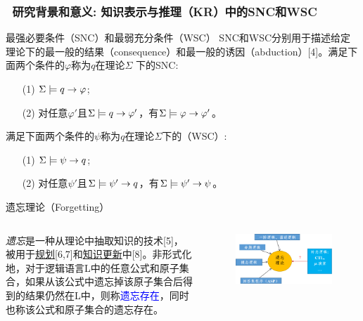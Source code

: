 \documentclass[9pt, CJK]{beamer}
\begin{document}
	\begin{frame}
		\frametitle{~研究背景和意义: {\small 知识表示与推理（KR）中的SNC和WSC}}
		{\small\begin{block}{最强必要条件（SNC）和最弱充分条件（WSC）}
			SNC和WSC分别用于描述给定理论下的最一般的结果（consequence）和最一般的诱因（abduction）[4]。满足下面两个条件的$\varphi$称为$q$在理论$\Sigma$ 下的SNC:
			\begin{itemize}
				\item[(1)] $\Sigma \models q \rightarrow \varphi$;
				\item[(2)] 对任意$\varphi'$且$\Sigma \models q \rightarrow \varphi'$，有$\Sigma \models \varphi \rightarrow \varphi'$。
			\end{itemize}
		满足下面两个条件的$\psi$称为$q$在理论$\Sigma$下的（WSC）:
		\begin{itemize}
			\item[(1)] $\Sigma \models \psi \rightarrow q$;
			\item[(2)] 对任意$\psi'$且$\Sigma \models \psi' \rightarrow q$，有$\Sigma \models \psi' \rightarrow \psi$。
		\end{itemize}
		\end{block}}
		\vskip 0.5pt
		{\small\begin{block}{遗忘理论（Forgetting）}
			\begin{columns}
				 {\em 遗忘}是一种从理论中抽取知识的技术[5]，被用于\underline{规划}[6,7]和\underline{知识更新}中[8]。非形式化地，对于逻辑语言L中的任意公式和原子集合，如果从该公式中遗忘掉该原子集合后得到的结果仍然在L中，则称\textcolor{blue}{遗忘存在}，同时也称该公式和原子集合的遗忘存在。
				\begin{figure}
					\includegraphics[scale=0.35]{figures/forgetting}
				\end{figure}
			\end{columns}
		\end{block}}
	\end{frame}
	
\end{document}
